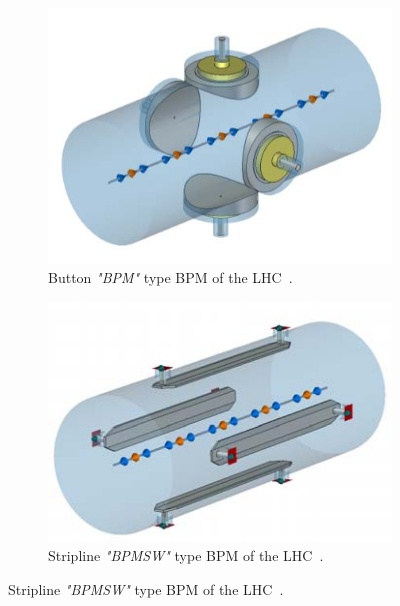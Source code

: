 \begin{figure}[!htb]
    \centering
    \begin{subfigure}[b]{0.45\textwidth}
        \includegraphics[width=\textwidth]{images/lhc_bpm_button.jpg}
        \caption{Button \textit{"BPM"} type BPM of the LHC~\cite{wendt_bpm_2020}.}
        \label{fig:beam_instrumentation_bpm_button}
    \end{subfigure}
    \hfill
    \begin{subfigure}[b]{0.45\textwidth}
        \includegraphics[width=\textwidth]{images/lhc_bpm_stripline.jpg}
        \caption{Stripline \textit{"BPMSW"} type BPM of the LHC~\cite{wendt_bpm_2020}.}
        \label{fig:beam_instrumentation_bpm_stripline}
    \end{subfigure}
\end{figure}

